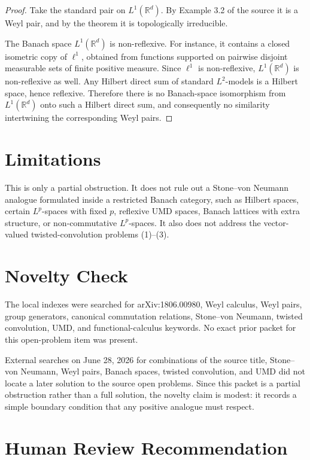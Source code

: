 \documentclass[11pt]{article}
\newcommand{\R}{\mathbb R}
\begin{document}
\begin{proof}
Take the standard pair on \(L^1(\R^d)\). By Example 3.2 of the source it is a
Weyl pair, and by the theorem it is topologically irreducible.

The Banach space \(L^1(\R^d)\) is non-reflexive. For instance, it contains a
closed isometric copy of \(\ell^1\), obtained from functions supported on
pairwise disjoint measurable sets of finite positive measure. Since \(\ell^1\)
is non-reflexive, \(L^1(\R^d)\) is non-reflexive as well. Any Hilbert direct
sum of standard \(L^2\)-models is a Hilbert space, hence reflexive. Therefore
there is no Banach-space isomorphism from \(L^1(\R^d)\) onto such a Hilbert
direct sum, and consequently no similarity intertwining the corresponding
Weyl pairs.
\end{proof}

\section*{Limitations}

This is only a partial obstruction. It does not rule out a Stone--von Neumann
analogue formulated inside a restricted Banach category, such as Hilbert
spaces, certain \(L^p\)-spaces with fixed \(p\), reflexive UMD spaces, Banach
lattices with extra structure, or non-commutative \(L^p\)-spaces. It also does
not address the vector-valued twisted-convolution problems (1)--(3).

\section*{Novelty Check}

The local indexes were searched for arXiv:1806.00980, Weyl calculus, Weyl
pairs, group generators, canonical commutation relations, Stone--von Neumann,
twisted convolution, UMD, and functional-calculus keywords. No exact prior
packet for this open-problem item was present.

External searches on June 28, 2026 for combinations of the source title,
Stone--von Neumann, Weyl pairs, Banach spaces, twisted convolution, and UMD did
not locate a later solution to the source open problems. Since this packet is
a partial obstruction rather than a full solution, the novelty claim is modest:
it records a simple boundary condition that any positive analogue must respect.

\section*{Human Review Recommendation}
\end{document}
